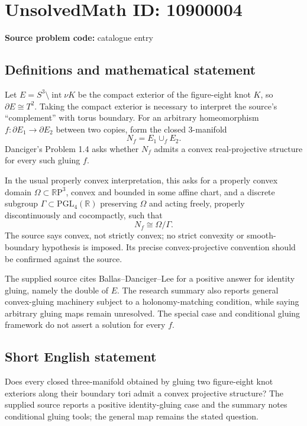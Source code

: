 \documentclass[11pt]{article}
\newcommand{\R}{\mathbb{R}}
\begin{document}
\section*{UnsolvedMath ID: 10900004}
\textbf{Source problem code:} catalogue entry
\subsection{Definitions and mathematical statement}
Let \(E=S^3\setminus\operatorname{int}\nu K\) be the compact exterior of the figure-eight knot \(K\), so \(\partial E\cong T^2\). Taking the compact exterior is necessary to interpret the source's ``complement'' with torus boundary. For an arbitrary homeomorphism \(f:\partial E_1\to\partial E_2\) between two copies, form the closed \(3\)-manifold
\[
 N_f=E_1\cup_f E_2.
\]
Danciger's Problem 1.4 asks whether \(N_f\) admits a convex real-projective structure for every such gluing \(f\).

In the usual properly convex interpretation, this asks for a properly convex domain \(\Omega\subset\R\mathrm P^3\), convex and bounded in some affine chart, and a discrete subgroup \(\Gamma\subset\mathrm{PGL}_4(\R)\) preserving \(\Omega\) and acting freely, properly discontinuously and cocompactly, such that
\[
 N_f\cong\Omega/\Gamma.
\]
The source says convex, not strictly convex; no strict convexity or smooth-boundary hypothesis is imposed. Its precise convex-projective convention should be confirmed against the source.

The supplied source cites Ballas--Danciger--Lee for a positive answer for identity gluing, namely the double of \(E\). The research summary also reports general convex-gluing machinery subject to a holonomy-matching condition, while saying arbitrary gluing maps remain unresolved. The special case and conditional gluing framework do not assert a solution for every \(f\).
\subsection{Short English statement}
Does every closed three-manifold obtained by gluing two figure-eight knot exteriors along their boundary tori admit a convex projective structure? The supplied source reports a positive identity-gluing case and the summary notes conditional gluing tools; the general map remains the stated question.
\end{document}
